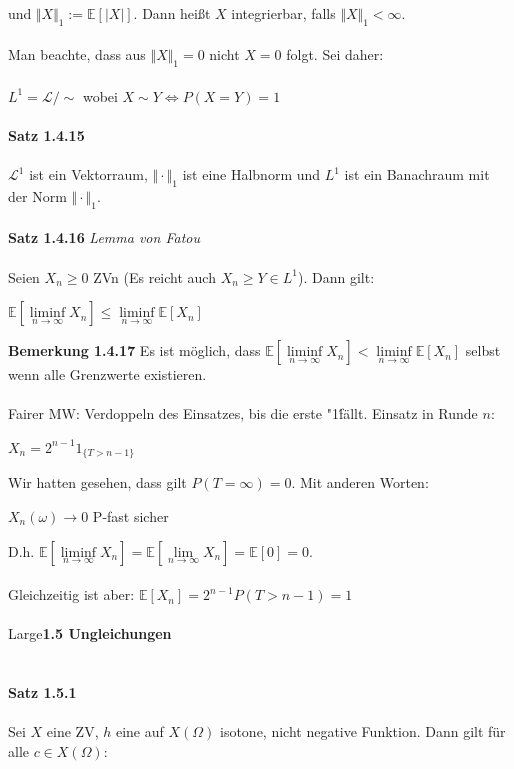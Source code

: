 \documentclass[10pt,a4paper]{report}
\numberwithin{equation}{section}
\numberwithin{figure}{section}
\theoremstyle{plain}
\theoremstyle{definition}
\theoremstyle{plain}
\theoremstyle{definition}
\theoremstyle{remark}
\theoremstyle{plain}
\theoremstyle{plain}
\theoremstyle{plain}
\newcommand{\1}{ \mathbb{1} } %
\begin{document}
und $\Vert X\Vert_1:=\mathbb{E}[|X|]$. Dann heißt $X$ integrierbar, falls $\Vert X \Vert_1 < \infty$.\\\\
Man beachte, dass aus $\Vert X \Vert_1=0$ nicht $X=0$ folgt. Sei daher:\\\\
$L^1=\mathcal{L}/\sim$ wobei $X\sim Y \Leftrightarrow P(X=Y)=1$\\\\
\textbf{Satz 1.4.15}\\\\
$\mathcal{L}^1$ ist ein Vektorraum, $\Vert \cdot \Vert_1$ ist eine Halbnorm und $L^1$ ist ein Banachraum mit der Norm $\Vert \cdot \Vert_1$.\\\\
\textbf{Satz 1.4.16} \textit{Lemma von Fatou}\\\\
Seien $X_n\geq 0$ ZVn (Es reicht auch $X_n \geq Y \in L^1$). Dann gilt:
\begin{center}
$\mathbb{E}[\liminf\limits_{n \to \infty} X_n]\leq \liminf\limits_{n \to \infty} \mathbb{E}[X_n]$
\end{center}
\textbf{Bemerkung 1.4.17}
Es ist möglich, dass $\mathbb{E}[\liminf\limits_{n \to \infty} X_n] < \liminf\limits_{n \to \infty} \mathbb{E}[X_n]$ selbst wenn alle Grenzwerte existieren.\\\\
Fairer MW: Verdoppeln des Einsatzes, bis die erste "1\' fällt. Einsatz in Runde $n$:
\begin{center}
$X_n=2^{n-1}1_{\{T>n-1\}}$
\end{center}
Wir hatten gesehen, dass gilt $P(T=\infty)=0$. Mit anderen Worten:
\begin{center}
$X_n(\omega) \to 0$ P-fast sicher
\end{center}
D.h. $\mathbb{E}[\liminf\limits_{n \to \infty} X_n]=\mathbb{E}[\lim\limits_{n \to \infty} X_n]=\mathbb{E}[0]=0$.\\\\
Gleichzeitig ist aber: $\mathbb{E}[X_n]=2^{n-1}P(T>n-1)=1$\\\\
Large{\textbf{1.5 Ungleichungen}}\normalsize\\\\\\
\textbf{Satz 1.5.1}\\\\
Sei $X$ eine ZV, $h$ eine auf $X(\Omega)$ isotone, nicht negative Funktion. Dann gilt für alle $c \in X(\Omega)$:
\end{document}
